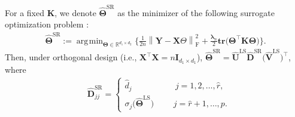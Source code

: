 \documentclass[alpha-refs]{wiley-article}
\DeclareMathOperator*{\argmin}{\arg\!\min}
\begin{document}
\begin{proposition} \label{surrogate}
    For a fixed $\boldsymbol{K}$, we denote $\widehat{\boldsymbol{\Theta}}^{\text{SR}}$ as the minimizer of the following surrogate optimization problem :
    \begin{align} \label{closed_form}
        \widehat{\boldsymbol{\Theta}}^{\text{SR}} :=
        \argmin_{\boldsymbol{\Theta}\in\mathbb{R}^{d_{1} \times d_{2}}} \Bigg\{ \frac{1}{2n} \left\| \boldsymbol{Y}-\boldsymbol{X}\Theta \right\|_{\text{F}}^{2} + \frac{\boldsymbol{\lambda}_{n}}{2}
        \textbf{tr}\big(\boldsymbol{\Theta}^{\top} \boldsymbol{K} \boldsymbol{\Theta} \big) \Bigg\}.
    \end{align}
    Then, under orthogonal design (i.e., $\boldsymbol{X}^{\top}\boldsymbol{X}=n\boldsymbol{I}_{d_{1} \times d_{1}}$),
    $\widehat{\boldsymbol{\Theta}}^{\text{SR}} = \widehat{\boldsymbol{U}}^{\text{LS}}\widehat{\boldsymbol{D}}^{\text{SR}}\big(\widehat{\boldsymbol{V}}^{\text{LS}}\big)^{\top}$, where
    \begin{align*}
        &\widehat{\boldsymbol{D}}^{\text{SR}}_{jj} =
        \begin{cases}
            \widehat{d}_{j} \qquad \qquad \quad \, j = 1,2,\dots,\widehat{r}, \\
            \sigma_{j}\big(\widehat{\boldsymbol{\Theta}}^{\text{LS}} \big)
            \quad \,\,\,\,\,\,\,\, j = \widehat{r}+1,\dots,p.
        \end{cases}
    \end{align*}
\end{proposition}
\end{document}

